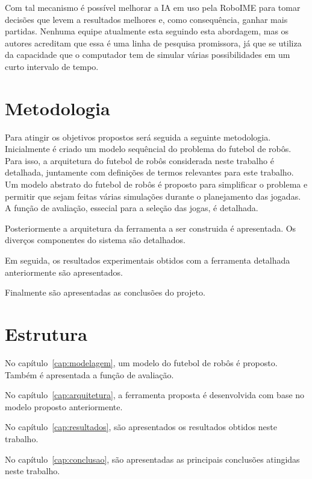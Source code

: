 Com tal mecanismo é possível melhorar a IA em uso pela RoboIME para tomar
decisões que levem a resultados melhores e, como consequência, ganhar mais
partidas. Nenhuma equipe atualmente esta seguindo esta abordagem, mas os autores
acreditam que essa é uma linha de pesquisa promissora, já que se utiliza da
capacidade que o computador tem de simular várias possibilidades em um curto
intervalo de tempo.

\section{Metodologia}

Para atingir os objetivos propostos será seguida a seguinte metodologia.
Inicialmente é criado um modelo sequêncial do problema do futebol de robôs.
Para isso, a arquitetura do futebol de robôs considerada neste trabalho é
detalhada, juntamente com definições de termos relevantes para este trabalho.
Um modelo abstrato do futebol de robôs é proposto para simplificar o problema
e permitir que sejam feitas várias simulações durante o planejamento das
jogadas. A função de avaliação, essecial para a seleção das jogas, é detalhada.

Posteriormente a arquitetura da ferramenta a ser construida é apresentada.
Os diverços componentes do sistema são detalhados.

Em seguida, os resultados experimentais obtidos com a ferramenta detalhada
anteriormente são apresentados.

Finalmente são apresentadas as conclusões do projeto.

\section{Estrutura}

No capítulo~\ref{cap:modelagem}, um modelo do futebol de robôs é proposto.
Também é apresentada a função de avaliação.

No capítulo~\ref{cap:arquitetura}, a ferramenta proposta é desenvolvida com
base no modelo proposto anteriormente.

No capítulo~\ref{cap:resultados}, são apresentados os resultados obtidos
neste trabalho.

No capítulo~\ref{cap:conclusao}, são apresentadas as principais conclusões
atingidas neste trabalho.

